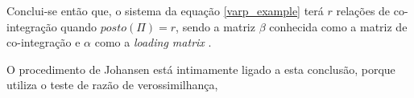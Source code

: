 \documentclass[a4paper,
               article,
               12pt,
               openany,
               oneside,
               english,
               brazil]{abntex2}
\numberwithin{equation}{section}
\begin{document}
   Conclui-se então que, o sistema da equação \eqref{varp_example} terá $ r $ relações de co-integração quando $ posto(\Pi) = r $, sendo a matriz $ \beta $ conhecida como a matriz de co-integração e $ \alpha $ como a \textit{loading matrix} \cite[p.~244-249]{lutkepool}.

   O procedimento de Johansen está intimamente ligado a esta conclusão, porque utiliza o teste de razão de verossimilhança, 



\newpage

\end{document}
